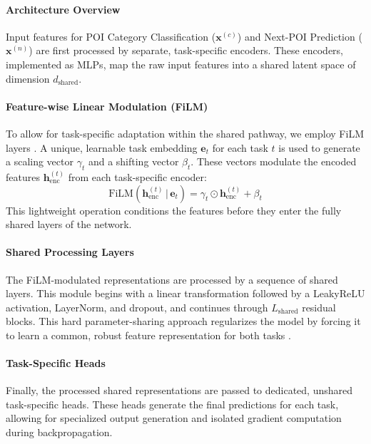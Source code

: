 \paragraph*{Architecture Overview}
Input features for POI Category Classification ($\mathbf{x}^{(c)}$) and Next-POI Prediction ($\mathbf{x}^{(n)}$) are first processed by separate, task-specific encoders. These encoders, implemented as MLPs, map the raw input features into a shared latent space of dimension $d_{\mathrm{shared}}$.

\paragraph*{Feature-wise Linear Modulation (FiLM)}
To allow for task-specific adaptation within the shared pathway, we employ FiLM layers \cite{perez2018film}. A unique, learnable task embedding $\mathbf{e}_{t}$ for each task $t$ is used to generate a scaling vector $\gamma_{t}$ and a shifting vector $\beta_{t}$. These vectors modulate the encoded features $\mathbf{h}_{\mathrm{enc}}^{(t)}$ from each task-specific encoder:
$$
\mathrm{FiLM}(\mathbf{h}_{\mathrm{enc}}^{(t)} \,|\, \mathbf{e}_{t}) = \gamma_{t} \odot \mathbf{h}_{\mathrm{enc}}^{(t)} + \beta_{t}
$$
This lightweight operation conditions the features before they enter the fully shared layers of the network.

\paragraph*{Shared Processing Layers}
The FiLM-modulated representations are processed by a sequence of shared layers. This module begins with a linear transformation followed by a LeakyReLU activation, LayerNorm, and dropout, and continues through $L_{\mathrm{shared}}$ residual blocks. This hard parameter-sharing approach regularizes the model by forcing it to learn a common, robust feature representation for both tasks \cite{baxter2000model}.

\paragraph*{Task-Specific Heads}
Finally, the processed shared representations are passed to dedicated, unshared task-specific heads. These heads generate the final predictions for each task, allowing for specialized output generation and isolated gradient computation during backpropagation.

